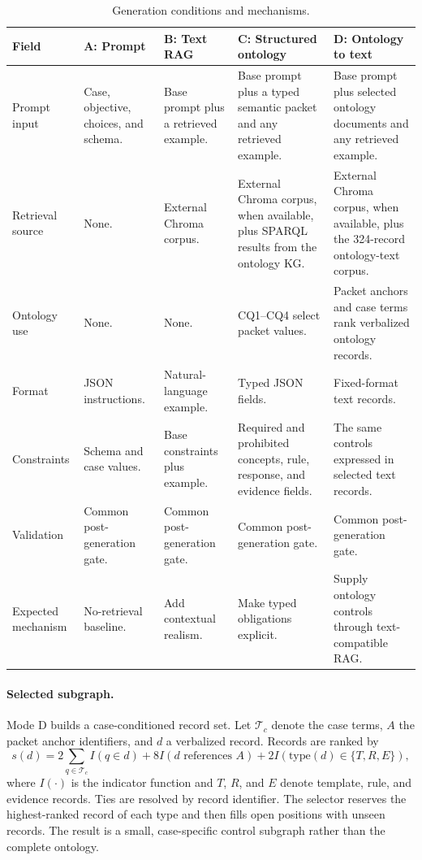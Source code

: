 \documentclass[runningheads]{llncs}
\begin{document}
\begin{table}[!htbp]
\caption{Generation conditions and mechanisms.}
\label{tab:conditions}
\centering
\fontsize{7.2}{7.8}\selectfont
\setlength{\tabcolsep}{1.1pt}
\renewcommand{\arraystretch}{0.98}
\begin{tabularx}{0.97\textwidth}{>{\raggedright\arraybackslash}p{1.75cm}LLLL}
\toprule
\textbf{Field} & \textbf{A: Prompt} & \textbf{B: Text RAG} &
\textbf{C: Structured ontology} & \textbf{D: Ontology to text}\\
\midrule
Prompt input & Case, objective, choices, and schema. & Base prompt plus a retrieved
example. & Base prompt plus a typed semantic packet and any retrieved example. &
Base prompt plus selected ontology documents and any retrieved example.\\
Retrieval source & None. & External Chroma corpus. & External Chroma corpus, when
available, plus SPARQL results from the ontology KG. & External Chroma corpus,
when available, plus the 324-record ontology-text corpus.\\
Ontology use & None. & None. & CQ1--CQ4 select packet values. & Packet anchors and
case terms rank verbalized ontology records.\\
Format & JSON instructions. & Natural-language example. & Typed JSON
fields. & Fixed-format text records.\\
Constraints & Schema and case values. & Base constraints plus example. & Required
and prohibited concepts, rule, response, and evidence fields. & The same controls
expressed in selected text records.\\
Validation & Common post-generation gate. & Common post-generation gate. & Common
post-generation gate. & Common post-generation gate.\\
Expected mechanism & No-retrieval baseline. & Add contextual realism. & Make typed
obligations explicit. & Supply ontology controls through text-compatible RAG.\\
\bottomrule
\end{tabularx}
\end{table}

\paragraph{Selected subgraph.}
Mode D builds a case-conditioned record set. Let $\mathcal{T}_c$ denote the case
terms, $A$
the packet anchor identifiers, and $d$ a verbalized record. Records are ranked by
\begin{equation}
s(d)=2\!\sum_{q\in \mathcal{T}_c}\!I(q\in d)+8I(d\text{ references }A)
 +2I(\mathrm{type}(d)\in\{T,R,E\}),
\end{equation}
where $I(\cdot)$ is the indicator function and $T$, $R$, and $E$ denote template,
rule, and evidence records. Ties are
resolved by record identifier. The selector reserves the highest-ranked record
of each type and then fills open positions with unseen records. The result is a
small, case-specific control subgraph rather than the complete ontology.
\end{document}
